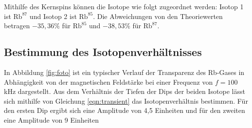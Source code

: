 Mithilfe des Kernspins können die Isotope wie folgt zugeordnet werden: Isotop 1 ist $\text{Rb}^{87}$
und Isotop 2 ist $\text{Rb}^{85}$. Die Abweichungen von den Theoriewerten betragen
$-35{,}36\%$ für $\text{Rb}^{85}$ und $-38{,}53\%$ für $\text{Rb}^{87}$.


\subsection{Bestimmung des Isotopenverhältnisses}
\label{subsec:Isotope}
In Abbildung \ref{fig:foto} ist ein typischer Verlauf der Transparenz des Rb-Gases in Abhängigkeit
von der magnetischen Feldstärke bei einer Frequenz von $f=100\,$kHz dargestellt.
Aus dem Verhältnis der Tiefen der Dips der beiden
Isotope lässt sich mithilfe von Gleichung \eqref{eqn:transient} das Isotopenverhältnis bestimmen.
Für den ersten Dip ergibt sich eine Amplitude von 4{,}5 Einheiten und für den zweiten
eine Amplitude von 9 Einheiten
